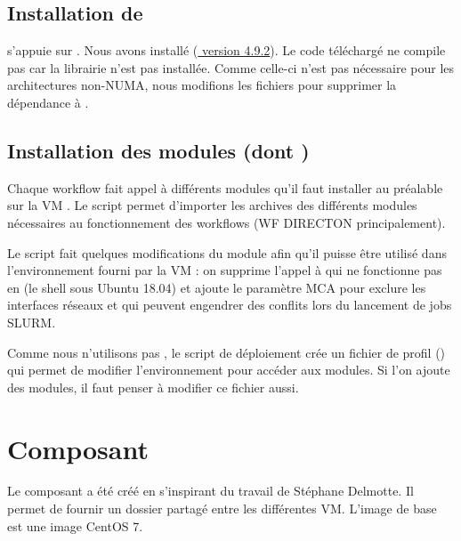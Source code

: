 \subsection{Installation de }

 s'appuie sur .
Nous avons installé (\href{https://github.com/pegasus-isi/pegasus/archive/4.9.2.zip}{ version 4.9.2}).
Le code téléchargé ne compile pas car la librairie  n'est pas installée.
Comme celle-ci n'est pas nécessaire pour les architectures non-NUMA, nous modifions les fichiers 
pour supprimer la dépendance à .

\subsection{Installation des modules (dont )} \label{subsec:installation_modules}

Chaque workflow fait appel à différents modules qu'il faut installer au préalable sur la VM .
Le script  permet d'importer les archives des différents modules nécessaires au fonctionnement des workflows (WF DIRECTON principalement).

Le script  fait quelques modifications du module  afin qu'il puisse être utilisé dans l'environnement fourni par la VM :
on supprime l'appel à  qui ne fonctionne pas en  (le shell sous Ubuntu 18.04)
et ajoute le paramètre MCA  pour exclure les interfaces réseaux  et  qui peuvent engendrer des conflits lors du lancement de jobs SLURM.

Comme nous n'utilisons pas , le script de déploiement crée
un fichier de profil ()
qui permet de modifier l'environnement pour accéder aux modules.
Si l'on ajoute des modules, il faut penser à modifier ce fichier aussi.

\section{Composant } \label{nfsserver}

Le composant  a été créé en s'inspirant du travail de Stéphane Delmotte.
Il permet de fournir un dossier partagé entre les différentes VM.
L'image de base est une image CentOS 7.

